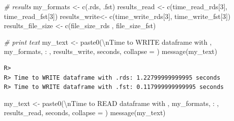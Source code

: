\documentclass[
  11pt,
]{book}
\newenvironment{Shaded}{\begin{snugshade}}{\end{snugshade}}
\newcommand{\AttributeTok}[1]{\textcolor[rgb]{0.61,0.61,0.61}{#1}}
\newcommand{\CommentTok}[1]{\textcolor[rgb]{0.37,0.37,0.37}{\textit{#1}}}
\newcommand{\DecValTok}[1]{\textcolor[rgb]{0.06,0.06,0.06}{#1}}
\newcommand{\FunctionTok}[1]{\textcolor[rgb]{0,0,0}{#1}}
\newcommand{\NormalTok}[1]{#1}
\newcommand{\OtherTok}[1]{\textcolor[rgb]{0.37,0.37,0.37}{#1}}
\newcommand{\SpecialCharTok}[1]{\textcolor[rgb]{0,0,0}{#1}}
\newcommand{\StringTok}[1]{\textcolor[rgb]{0.5,0.5,0.5}{#1}}
\begin{document}
\begin{Shaded}
\begin{Highlighting}[]
\CommentTok{\# results}
\NormalTok{my\_formats }\OtherTok{\textless{}{-}} \FunctionTok{c}\NormalTok{(}\StringTok{\textquotesingle{}.rds\textquotesingle{}}\NormalTok{, }\StringTok{\textquotesingle{}.fst\textquotesingle{}}\NormalTok{)}
\NormalTok{results\_read }\OtherTok{\textless{}{-}} \FunctionTok{c}\NormalTok{(time\_read\_rds[}\DecValTok{3}\NormalTok{], time\_read\_fst[}\DecValTok{3}\NormalTok{])}
\NormalTok{results\_write}\OtherTok{\textless{}{-}} \FunctionTok{c}\NormalTok{(time\_write\_rds[}\DecValTok{3}\NormalTok{], time\_write\_fst[}\DecValTok{3}\NormalTok{])}
\NormalTok{results\_file\_size }\OtherTok{\textless{}{-}} \FunctionTok{c}\NormalTok{(file\_size\_rds , file\_size\_fst)}

\CommentTok{\# print text}
\NormalTok{my\_text }\OtherTok{\textless{}{-}} \FunctionTok{paste0}\NormalTok{(}\StringTok{\textquotesingle{}}\SpecialCharTok{\textbackslash{}n}\StringTok{Time to WRITE dataframe with \textquotesingle{}}\NormalTok{,}
\NormalTok{                  my\_formats, }\StringTok{\textquotesingle{}: \textquotesingle{}}\NormalTok{,}
\NormalTok{                  results\_write, }\StringTok{\textquotesingle{} seconds\textquotesingle{}}\NormalTok{, }\AttributeTok{collapse =} \StringTok{\textquotesingle{}\textquotesingle{}}\NormalTok{)}
\FunctionTok{message}\NormalTok{(my\_text)}
\end{Highlighting}
\end{Shaded}

\begin{verbatim}
R> 
R> Time to WRITE dataframe with .rds: 1.22799999999995 seconds
R> Time to WRITE dataframe with .fst: 0.117999999999995 seconds
\end{verbatim}

\begin{Shaded}
\begin{Highlighting}[]
\NormalTok{my\_text }\OtherTok{\textless{}{-}} \FunctionTok{paste0}\NormalTok{(}\StringTok{\textquotesingle{}}\SpecialCharTok{\textbackslash{}n}\StringTok{Time to READ dataframe with \textquotesingle{}}\NormalTok{,}
\NormalTok{                  my\_formats, }\StringTok{\textquotesingle{}: \textquotesingle{}}\NormalTok{,}
\NormalTok{                  results\_read, }\StringTok{\textquotesingle{} seconds\textquotesingle{}}\NormalTok{, }\AttributeTok{collapse =} \StringTok{\textquotesingle{}\textquotesingle{}}\NormalTok{)}
\FunctionTok{message}\NormalTok{(my\_text)}
\end{Highlighting}
\end{Shaded}
\end{document}
